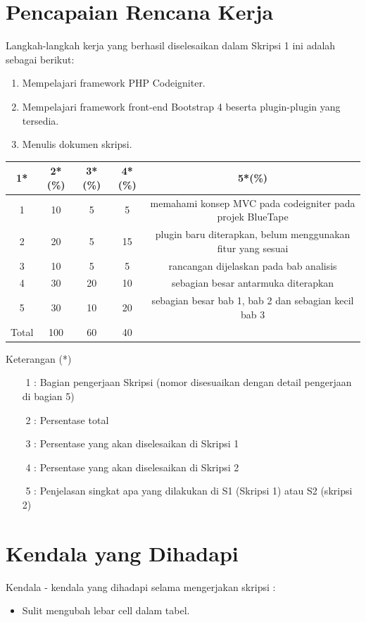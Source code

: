 \documentclass[a4paper,twoside]{article}
\begin{document}
\section{Pencapaian Rencana Kerja}
Langkah-langkah kerja yang berhasil diselesaikan dalam Skripsi 1 ini adalah sebagai berikut:
\begin{enumerate}
	\item Mempelajari framework PHP Codeigniter.
	\item Mempelajari framework front-end Bootstrap 4 beserta plugin-plugin yang tersedia.
	\item Menulis dokumen skripsi.
\end{enumerate}
\begin{center}
	\begin{tabular}{|c|c|c|c|c|} 
		\hline
		1* & 2*(\%) & 3*(\%) & 4*(\%) & 5*(\%) \\ [0.5ex] 
		\hline\hline
		1 & 10 & 5 & 5 & memahami konsep MVC pada codeigniter pada projek BlueTape\\ 
		\hline
		2 & 20 & 5 & 15 & plugin baru diterapkan, belum menggunakan fitur yang sesuai \\
		\hline
		3 & 10 & 5 & 5 &  rancangan dijelaskan pada bab analisis\\
		\hline
		4 & 30 & 20 & 10 & sebagian besar antarmuka diterapkan\\
		\hline
		5 & 30 & 10 & 20 & sebagian besar bab 1, bab 2 dan sebagian kecil bab 3\\ [1ex] 
		\hline
		Total & 100 & 60 & 40 & \\ [1ex] 
		\hline
	\end{tabular}
\end{center}
Keterangan (*)
\begin{itemize}
	\item [$ $] 1 : Bagian pengerjaan Skripsi (nomor disesuaikan dengan detail pengerjaan di bagian 5)
	\item [$ $] 2 : Persentase total
	\item [$ $] 3 : Persentase yang akan diselesaikan di Skripsi 1
	\item [$ $] 4 : Persentase yang akan diselesaikan di Skripsi 2
	\item [$ $] 5 : Penjelasan singkat apa yang dilakukan di S1 (Skripsi 1) atau S2 (skripsi 2)	
\end{itemize}

\section{Kendala yang Dihadapi}
Kendala - kendala yang dihadapi selama mengerjakan skripsi :
\begin{itemize}
	\item Sulit mengubah lebar cell dalam tabel.
\end{itemize}
\end{document}
